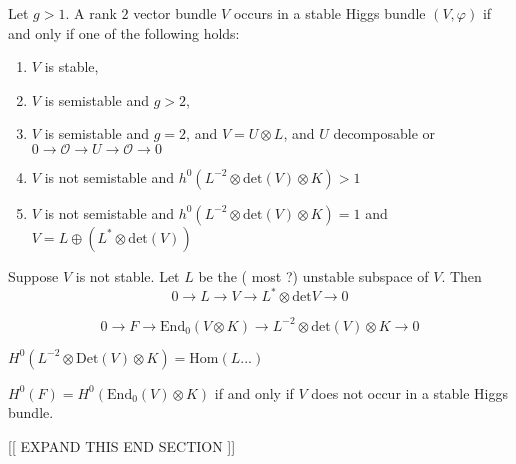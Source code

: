 \begin{proposition}
    Let $ g>1 $. A rank $2$ vector bundle $V$ occurs in a stable Higgs bundle $(V, \varphi) $ if and only if one of the following holds: 
    \begin{enumerate}[label=(\roman*)]
        \item $V$ is stable,
        \item $V$ is semistable and $g>2$, 
        \item $V$ is semistable and $g=2$, and $V = U \otimes L$, 
            and $U$ decomposable or $0 \rightarrow  \mathcal{O} \rightarrow U \rightarrow \mathcal{O} \rightarrow 0 $ 
        \item $V$ is not semistable and $h^0 (L^{-2} \otimes \mathrm{det}(V) \otimes K ) > 1 $ 
        \item $V$ is not semistable and $h^0 (L^{-2} \otimes \mathrm{det}(V) \otimes K ) = 1 $ and $V = L\oplus (L^* \otimes \mathrm{det}(V) ) $
    \end{enumerate}

\end{proposition}

Suppose $V$ is not stable. 
Let $ L$ be the ( most ?) unstable subspace of $V$. 
Then
\begin{equation}
    0 \rightarrow  L \rightarrow  V \rightarrow  L^* \otimes \mathrm{det} V  \rightarrow  0 
\end{equation}

\begin{equation}
    0 \rightarrow  F \rightarrow  \mathrm{End} _0 ( V \otimes K) \rightarrow L^{-2} \otimes \mathrm{det} ( V) \otimes K \rightarrow  0 
\end{equation}

$H^0 ( L^{-2} \otimes \mathrm{Det} (V)  \otimes K ) = \mathrm{Hom} ( L...) $ 


$H^0 ( F) = H^0 ( \mathrm{End}_0 ( V) \otimes K ) $ 
if and only if $ V$ does not occur in a stable Higgs bundle. 

[[ EXPAND THIS END SECTION ]]









 

